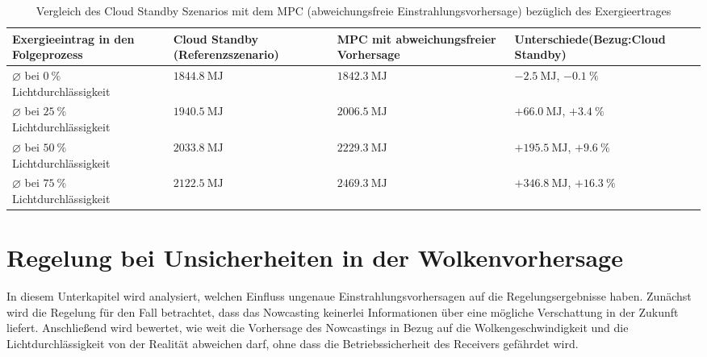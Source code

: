 \begingroup
\renewcommand{\arraystretch}{1.2}
\begin{table}[ht!]
    \caption[Vergleich des Cloud Standby Szenarios mit dem MPC (abweichungsfreie Einstrahlungsvorhersage) bezüglich des Exergieertrages]{Vergleich des Cloud Standby Szenarios mit dem MPC (abweichungsfreie Einstrahlungsvorhersage) bezüglich des Exergieertrages}
    \centering
    \begin{tabular}{>{\centering\arraybackslash}m{}>{\centering\arraybackslash}m{}>{\centering\arraybackslash}m{}>{\centering\arraybackslash}m{}}
        \rowcolor{white}
        \toprule
        Exergieeintrag in den Folgeprozess                       & Cloud Standby (Referenzszenario) & MPC mit abweichungsfreier Vorhersage & Unterschiede\linebreak (Bezug:\linebreak Cloud Standby) \\
        \midrule
        $\diameter$ bei $\SI{0}{\percent}$ Lichtdurchlässigkeit  & $\SI{1844.8}{\mega\joule}$       & $\SI{1842.3}{\mega\joule}$           & $\SI{-2.5}{\mega\joule}$, $\SI{-0.1}{\percent}$         \\
        $\diameter$ bei $\SI{25}{\percent}$ Lichtdurchlässigkeit & $\SI{1940.5}{\mega\joule}$       & $\SI{2006.5}{\mega\joule}$           & $+\SI{66.0}{\mega\joule}$, $+\SI{3.4}{\percent}$        \\
        $\diameter$ bei $\SI{50}{\percent}$ Lichtdurchlässigkeit & $\SI{2033.8}{\mega\joule}$       & $\SI{2229.3}{\mega\joule}$           & $+\SI{195.5}{\mega\joule}$, $+\SI{9.6}{\percent}$       \\
        $\diameter$ bei $\SI{75}{\percent}$ Lichtdurchlässigkeit & $\SI{2122.5}{\mega\joule}$       & $\SI{2469.3}{\mega\joule}$           & $+\SI{346.8}{\mega\joule}$, $+\SI{16.3}{\percent}$      \\
        \toprule
    \end{tabular}
    \label{tab_exergie1}
\end{table}
\endgroup


\section{Regelung bei Unsicherheiten in der Wolkenvorhersage} \label{sec_Ungenauigkeit}
In diesem Unterkapitel wird analysiert, welchen Einfluss ungenaue Einstrahlungsvorhersagen auf die Regelungsergebnisse haben.
Zunächst wird die Regelung für den Fall betrachtet, dass das Nowcasting keinerlei Informationen über eine mögliche Verschattung in der Zukunft liefert.
Anschließend wird bewertet, wie weit die Vorhersage des Nowcastings in Bezug auf die Wolkengeschwindigkeit und die Lichtdurchlässigkeit von der Realität abweichen darf, ohne dass die Betriebssicherheit des Receivers gefährdet wird.

